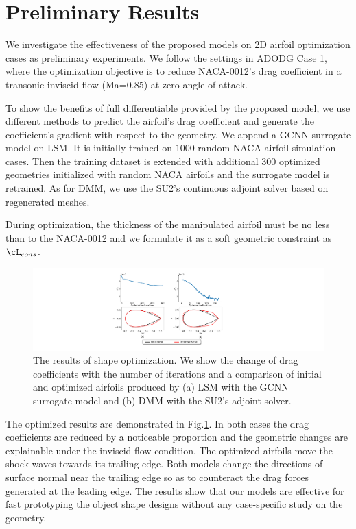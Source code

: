 \section{Preliminary Results}
\label{ch4:sec:results}
We investigate the effectiveness of the proposed models on 2D airfoil optimization cases as preliminary experiments.
We follow the settings in ADODG Case 1, where the optimization objective is to reduce NACA-0012's drag coefficient in a transonic inviscid flow (Ma=0.85) at zero angle-of-attack.

To show the benefits of full differentiable provided by the proposed model, we use different methods to predict the airfoil's drag coefficient and generate the coefficient's gradient with respect to the geometry.
We append a GCNN surrogate model \cite{aa.Baque2018} on LSM.
It is initially trained on $1000$ random NACA airfoil simulation cases.
Then the training dataset is extended with additional $300$ optimized geometries initialized with random NACA airfoils and the surrogate model is retrained.
As for DMM, we use the SU2's continuous adjoint solver \cite{aa.Economon2016} based on regenerated meshes.

During optimization, the thickness of the manipulated airfoil must be no less than to the NACA-0012 and we formulate it as a soft geometric constraint as $\cL_{cons}$.

\begin{figure}[!htb]
    \begin{center}
        \includegraphics[width=1\linewidth]{chapter4/fig/optim_result.pdf}
    \end{center}
    \caption{
        \small The results of shape optimization. We show the change of drag coefficients with the number of iterations and a comparison of initial and optimized airfoils produced by (a) LSM with the GCNN surrogate model and (b) DMM with the SU2's adjoint solver.
    }
    \label{ch4:fig:optm_res}
\end{figure}

The optimized results are demonstrated in Fig.\ref{ch4:fig:optm_res}. 
In both cases the drag coefficients are reduced by a noticeable proportion and the geometric changes are explainable under the inviscid flow condition. 
The optimized airfoils move the shock waves towards its trailing edge. 
Both models change the directions of surface normal near the trailing edge so as to counteract the drag forces generated at the leading edge.
The results show that our models are
effective for fast prototyping the object shape designs without any case-specific study on the geometry.

